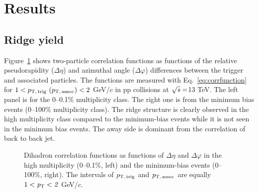 
\section {Results}
\label{sec:results}

\subsection{Ridge yield}

Figure~\ref{fig:PlotCorrMBHMT} shows two-particle correlation functions as functions of the relative pseudorapidity ($\Delta \eta$) and azimuthal angle ($\Delta \varphi$) differences between the trigger and associated particles. The functions are measured with Eq.~\ref{eq:corrfunction} for $1 < p_\mathrm{T,\,trig}~\mathrm (p_\mathrm{T,\,assoc}) < 2$ GeV/$c$ in pp collisions at $\sqrt{\it{s}} = $\unit{13} {\rm{}TeV}. The left panel is for the 0--0.1\% multiplicity class. The right one is from the minimum bias events (0--100\% multiplicity class). The ridge structure is clearly observed in the high multiplicity class compared to the minimum-bias events while it is not seen in the minimum bias events. The away side is dominant from the correlation of back to back jet.

\begin{figure}[h!]
	\centering
	\caption{ Dihadron correlation functions as functions of $\Delta\eta$ and $\Delta\varphi$ in the high multiplicity (0--0.1\%, left) and the minimum-bias events (0--100\%, right). The intervals of $p_\mathrm{T,\,trig}$ and $p_\mathrm{T,\,assoc}$ are equally $1 < \it{p}_{\rm{T}} < 2$ GeV/$c$. }
	\label{fig:PlotCorrMBHMT}
\end{figure}

